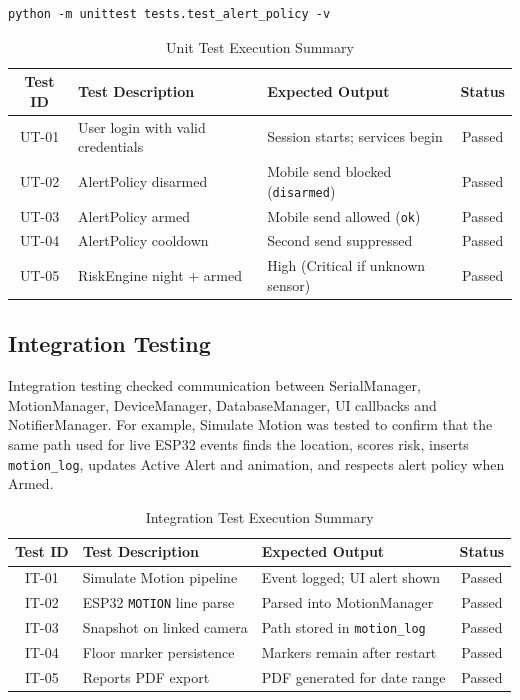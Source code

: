 \documentclass[12pt,a4paper]{report}
\begin{document}
\begin{verbatim}
python -m unittest tests.test_alert_policy -v
\end{verbatim}

\begin{table}[H]
\centering
\label{tab:unit-testing}
\begin{tabular}{|c|p{5cm}|p{5cm}|c|}
\hline
\textbf{Test ID} & \textbf{Test Description} & \textbf{Expected Output} & \textbf{Status} \\
\hline
UT-01 & User login with valid credentials & Session starts; services begin & Passed \\
\hline
UT-02 & AlertPolicy disarmed & Mobile send blocked (\texttt{disarmed}) & Passed \\
\hline
UT-03 & AlertPolicy armed & Mobile send allowed (\texttt{ok}) & Passed \\
\hline
UT-04 & AlertPolicy cooldown & Second send suppressed & Passed \\
\hline
UT-05 & RiskEngine night + armed & High (Critical if unknown sensor) & Passed \\
\hline
\end{tabular}
\caption{Unit Test Execution Summary}
\end{table}

\subsection{Integration Testing}

Integration testing checked communication between SerialManager, MotionManager, DeviceManager, DatabaseManager, UI callbacks and NotifierManager. For example, Simulate Motion was tested to confirm that the same path used for live ESP32 events finds the location, scores risk, inserts \texttt{motion\_log}, updates Active Alert and animation, and respects alert policy when Armed.

\begin{table}[H]
\centering
\label{tab:integration-testing}
\begin{tabular}{|c|p{5cm}|p{5cm}|c|}
\hline
\textbf{Test ID} & \textbf{Test Description} & \textbf{Expected Output} & \textbf{Status} \\
\hline
IT-01 & Simulate Motion pipeline & Event logged; UI alert shown & Passed \\
\hline
IT-02 & ESP32 \texttt{MOTION} line parse & Parsed into MotionManager & Passed \\
\hline
IT-03 & Snapshot on linked camera & Path stored in \texttt{motion\_log} & Passed \\
\hline
IT-04 & Floor marker persistence & Markers remain after restart & Passed \\
\hline
IT-05 & Reports PDF export & PDF generated for date range & Passed \\
\hline
\end{tabular}
\caption{Integration Test Execution Summary}
\end{table}
\end{document}
